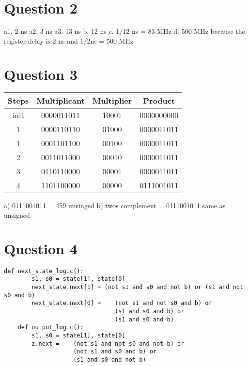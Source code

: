 \documentclass[12pt,letterpaper]{article}
\begin{document}
\newpage

\section*{Question 2}

a1. 2 ns
\newline
a2. 3 ns
\newline
a3.  13 ns
\newline
b. 12 ns
\newline
c. 1/12 ns = 83 MHz
\newline
d. 500 MHz because the register delay is 2 ns and 1/2ns = 500 MHz


\section*{Question 3}
\begin{table}[H]
\begin{tabular}{|c|c|c|c|}
\hline
Steps & Multiplicant & Multiplier & Product    \\ \hline
init  & 0000011011   & 10001      & 0000000000 \\ \hline
1     & 0000110110   & 01000      & 0000011011 \\ \hline
1     & 0001101100   & 00100      & 0000011011 \\ \hline
2     & 0011011000   & 00010      & 0000011011 \\ \hline
3     & 0110110000   & 00001      & 0000011011 \\ \hline
4     & 1101100000   & 00000      & 0111001011 \\ \hline
\end{tabular}
\end{table}
a) 0111001011 = 459 unsinged
\newline
b) twos complement = 0111001011 same as unsigned

\section*{Question 4}
     \begin{lstlisting}[style = Python]
    def next_state_logic():
        s1, s0 = state[1], state[0]
        next_state.next[1] = (not s1 and s0 and not b) or (s1 and not s0 and b)
        next_state.next[0] =    (not s1 and not s0 and b) or  
                                (s1 and s0 and b) or 
                                (s1 and s0 and b)
    def output_logic():
        s1, s0 = state[1], state[0]
        z.next =    (not s1 and not s0 and not b) or 
                    (not s1 and s0 and b) or 
                    (s1 and s0 and not b)
    \end{lstlisting}
\end{document}
